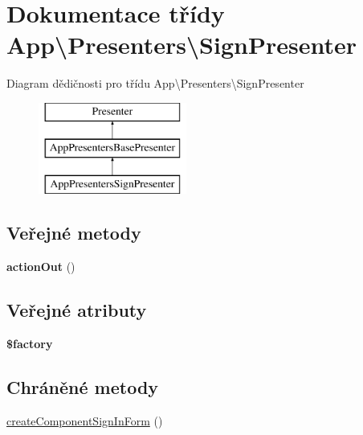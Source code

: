 \hypertarget{classApp_1_1Presenters_1_1SignPresenter}{\section{Dokumentace třídy App\textbackslash{}Presenters\textbackslash{}Sign\-Presenter}
\label{classApp_1_1Presenters_1_1SignPresenter}
}
Diagram dědičnosti pro třídu App\textbackslash{}Presenters\textbackslash{}Sign\-Presenter\begin{figure}[H]
\begin{center}
\leavevmode
\includegraphics[height=3.000000cm]{classApp_1_1Presenters_1_1SignPresenter}
\end{center}
\end{figure}
\subsection*{Veřejné metody}
\begin{DoxyCompactItemize}
\item 
\hypertarget{classApp_1_1Presenters_1_1SignPresenter_ae9e35c3580aec527734f0839b1fab9fd}{{\bfseries action\-Out} ()}\label{classApp_1_1Presenters_1_1SignPresenter_ae9e35c3580aec527734f0839b1fab9fd}

\end{DoxyCompactItemize}
\subsection*{Veřejné atributy}
\begin{DoxyCompactItemize}
\item 
\hypertarget{classApp_1_1Presenters_1_1SignPresenter_a029117e748148c0452842c23c6fbf0ca}{{\bfseries \$factory}}\label{classApp_1_1Presenters_1_1SignPresenter_a029117e748148c0452842c23c6fbf0ca}

\end{DoxyCompactItemize}
\subsection*{Chráněné metody}
\begin{DoxyCompactItemize}
\item 
\hyperlink{classApp_1_1Presenters_1_1SignPresenter_aa273d99d39b395490fbdfc2702daef38}{create\-Component\-Sign\-In\-Form} ()
\end{DoxyCompactItemize}


